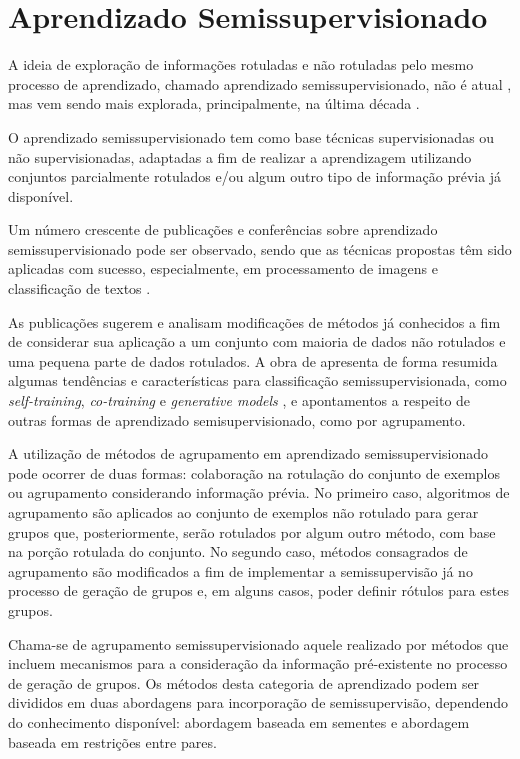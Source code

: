 \section{Aprendizado Semissupervisionado}  \label{ChAM:semissupervisionado}

A ideia de exploração de informações rotuladas e não rotuladas pelo mesmo processo de aprendizado, chamado aprendizado semissupervisionado, não é atual \cite{Pedrycz1985, Board1989}, mas vem sendo mais explorada, principalmente, na última década \cite{Chapelle2006, Schwenker2014}.
 
O aprendizado semissupervisionado tem como base técnicas supervisionadas ou não supervisionadas, adaptadas a fim de realizar a aprendizagem utilizando conjuntos parcialmente rotulados e/ou algum outro tipo de informação prévia já disponível.

Um número crescente de publicações e conferências sobre aprendizado semissupervisionado pode ser observado, sendo que as técnicas propostas têm sido aplicadas com sucesso, especialmente, em processamento de imagens \cite{Bensaid1996,Grira2006,Pedrycz2008} e classificação de textos \cite{Liu2003,Geng2009}.

As publicações sugerem e analisam modificações de métodos já conhecidos a fim de considerar sua aplicação a um conjunto com maioria de dados não rotulados e uma pequena parte de dados rotulados. A obra de  apresenta de forma resumida algumas tendências e características para classificação semissupervisionada, como \emph{self-training}, \emph{co-training} e \emph{generative models} \cite{Chapelle2006}, e apontamentos a respeito de outras formas de aprendizado semisupervisionado, como por agrupamento.

A utilização de métodos de agrupamento em aprendizado semissupervisionado pode ocorrer de duas formas: colaboração na rotulação do conjunto de exemplos ou agrupamento considerando informação prévia. No primeiro caso, algoritmos de agrupamento são aplicados ao conjunto de exemplos não rotulado para gerar grupos que, posteriormente, serão rotulados por algum outro método, com base na porção rotulada do conjunto. No segundo caso, métodos consagrados de agrupamento são modificados a fim de implementar a semissupervisão já no processo de geração de grupos e, em alguns casos, poder definir rótulos para estes grupos.

Chama-se de agrupamento semissupervisionado aquele realizado por métodos que incluem mecanismos para a consideração da informação pré-existente no processo de geração de grupos. Os métodos desta categoria de aprendizado podem ser divididos em duas abordagens para incorporação de semissupervisão, dependendo do conhecimento disponível: abordagem baseada em sementes e abordagem baseada em restrições entre pares.

